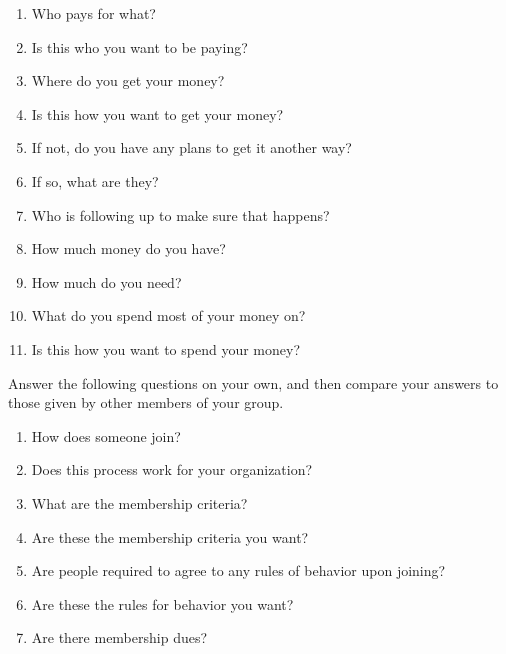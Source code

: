 \begin{enumerate}

\item
  Who pays for what?

\item
  Is this who you want to be paying?

\item
  Where do you get your money?

\item
  Is this how you want to get your money?

\item
  If not, do you have any plans to get it another way?

\item
  If so, what are they?

\item
  Who is following up to make sure that happens?

\item
  How much money do you have?

\item
  How much do you need?

\item
  What do you spend most of your money on?

\item
  Is this how you want to spend your money?

\end{enumerate}


Answer the following questions on your own, and then compare your
answers to those given by other members of your group.

\begin{enumerate}

\item
  How does someone join?

\item
  Does this process work for your organization?

\item
  What are the membership criteria?

\item
  Are these the membership criteria you want?

\item
  Are people required to agree to any rules of behavior upon joining?

\item
  Are these the rules for behavior you want?

\item
  Are there membership dues?

\end{enumerate}

